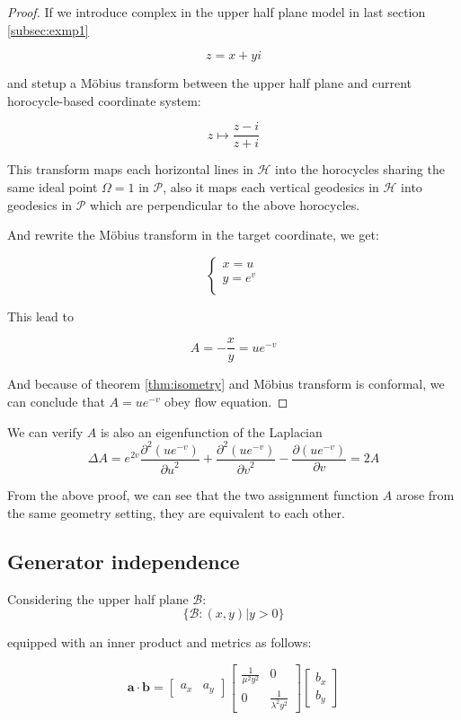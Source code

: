 \begin{proof}

If we introduce complex in the upper half plane model in last section \ref{subsec:exmp1}

$$
z = x + y i
$$

and stetup a Möbius transform between the upper half plane and current horocycle-based coordinate system:

$$
z \mapsto \frac{z-i}{z+i}
$$

This transform maps each horizontal lines in $\mathcal{H}$ into the horocycles sharing the same ideal point $\Omega = 1$ in $\mathcal{P}$,
also it maps each vertical geodesics in $\mathcal{H}$ into geodesics in $\mathcal{P}$ which are perpendicular to the above horocycles.

And rewrite the Möbius transform in the target coordinate, we get:

$$
\begin{cases}
x = u\\
y = e^v \\
\end{cases}
$$

This lead to

$$
A = -\frac{x}{y} = u e^{-v}
$$

And because of theorem \ref{thm:isometry} and Möbius transform is conformal, we can conclude that $A = u e^{-v}$ obey flow equation.

\end{proof}

We can verify $A$ is also an eigenfunction of the Laplacian
$$
\Delta A = e^{2v} \frac{\partial^2(u e^{-v})}{{\partial u}^2} + \frac{\partial^2(u e^{-v})}{{\partial v}^2} - \frac{\partial(u e^{-v})}{\partial v} = 2A
$$

From the above proof, we can see that the two assignment function $A$ arose from the same geometry setting, they are equivalent to each other.

\subsection{Generator independence}

Considering the upper half plane $\mathcal{B}$:
$$
\{\mathcal{B}: (x, y) | y > 0 \}
$$

equipped with an inner product and metrics as follows:

$$
\mathbf{a} \cdot \mathbf{b} = \begin{bmatrix} a_x & a_y \end{bmatrix} \begin{bmatrix} \frac{1}{\mu^2 y^2} & 0 \\ 0 & \frac{1}{\lambda^2 y^2} \end{bmatrix} \begin{bmatrix} b_x \\ b_y \end{bmatrix}
$$

